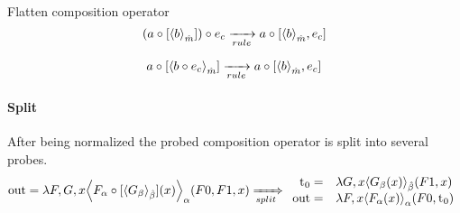 Flatten composition operator
$$ \expCompSingle{ (\expComp{a}{b}{m})}{c}{n} 
\rewriteRule{}
\expCompList{a}{b}{m}
$$

$$ \expComp{a}{\expCompSingle{b}{c}{n}}{m} 
\rewriteRule{}
\expCompList{a}{b}{m}
$$



\paragraph{Split}
After being normalized the probed composition operator is split into several probes.
$$
\text{\lstinline!out!} = \lambda F,G,x \EinExp{\expComp{F_\alpha}{G_\beta}{\beta}(x)}{\alpha}(F0, F1, x)
\rewriteSplit{}
\begin{array}{rl}
\lstinline!t!_0 = & \lambda G,x\EinExp{G_\beta(x)}{\hat{\beta}}(F1,x)\\
\text{\lstinline!out!}= & \lambda F,x \EinExp{F_\alpha(x)}{\alpha}(F0, \lstinline!t!_0)
 \end{array}$$
 